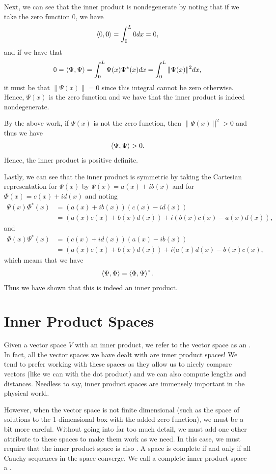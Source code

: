 Next, we can see that the inner product is nondegenerate by noting that if we take the zero function 0, we have
\[
\left\langle 0, 0 \right\rangle = \int_0^L 0 dx = 0,
\]
and if we have that
\[
0=\left\langle \Psi, \Psi \right\rangle  = \int_0^L \Psi(x)\Psi^*(x)dx = \int_0^L \|\Psi(x)\|^2dx,
\]
it must be that $\|\Psi(x)\|=0$ since this integral cannot be zero otherwise.  Hence, $\Psi(x)$ is the zero function and we have that the inner product is indeed nondegenerate.

By the above work, if $\Psi(x)$ is not the zero function, then $\|\Psi(x)\|^2>0$ and thus we have
\[
\left\langle \Psi, \Psi \right\rangle>0.
\]
Hence, the inner product is positive definite.

Lastly, we can see that the inner product is symmetric by taking the Cartesian representation for $\Psi(x)$ by $\Psi(x)=a(x)+ib(x)$ and for $\Phi(x)=c(x)+id(x)$ and noting
\begin{align*}
	\Psi(x)\Phi^*(x) &= (a(x)+ib(x))(c(x)-id(x))\\
		&= (a(x)c(x)+b(x)d(x))+i(b(x)c(x)-a(x)d(x)),
\end{align*}
and
\begin{align*}
	\Phi(x)\Psi^*(x) &= (c(x)+id(x))(a(x)-ib(x))\\
		&= (a(x)c(x)+b(x)d(x))+i(a(x)d(x)-b(x)c(x),
\end{align*}
which means that we have
\[
\left\langle \Psi, \Phi \right\rangle=\left\langle \Phi, \Psi \right\rangle^*.
\]
Thus we have shown that this is indeed an inner product.

\section{Inner Product Spaces}

Given a vector space $V$ with an inner product, we refer to the vector space as an .  In fact, all the vector spaces we have dealt with are inner product spaces! We tend to prefer working with these spaces as they allow us to nicely compare vectors (like we can with the dot product) and we can also compute lengths and distances.  Needless to say, inner product spaces are immensely important in the physical world.

However, when the vector space is not finite dimensional (such as the space of solutions to the 1-dimensional box with the added zero function), we must be a bit more careful.  Without going into far too much detail, we must add one other attribute to these spaces to make them work as we need.  In this case, we must require that the inner product space is also .  A space is complete if and only if all Cauchy sequences in the space converge. We call a complete inner product space a .

